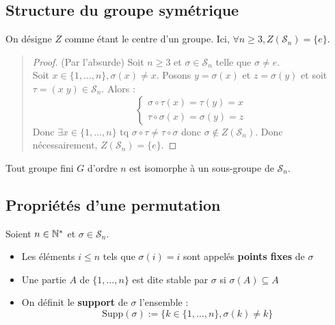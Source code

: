 \subsection{Structure du groupe symétrique}

\begin{theorem}
	On désigne $Z$ comme étant le centre d'un groupe. Ici, $\forall n \geq 3, Z(\mathcal{S}_n) = \{e\}$.
\end{theorem}

\begin{quote}
	\footnotesize
	\begin{proof}(Par l'absurde)
		Soit $n \geq 3$ et $\sigma \in \mathcal{S}_n$ telle que $ \sigma \not = e $. \\ 
		Soit $ x \in \{1,\dots,n\}, \sigma(x) \not = x$. Posons $y = \sigma(x)$ et $z = \sigma(y)$ et soit $\tau = (x \; y) \in \mathcal{S}_n$.
		Alors :
		\[
			\begin{cases}
				\sigma \circ \tau (x) = \tau(y) = x \\
				\tau \circ \sigma(x) = \sigma(y) = z 
			\end{cases} \]
		Donc $\exists x \in \{1,\dots,n\}$ tq $ \sigma \circ \tau \not = \tau \circ \sigma $ donc $ \sigma \not \in Z(\mathcal{S}_n)$.
		Donc nécessairement, $Z(\mathcal{S}_n) = \{e\}$.
	\end{proof}
	\normalsize
\end{quote}

\begin{theorem}[Cayley]
	Tout groupe fini $G$ d'ordre $n$ est isomorphe à un sous-groupe de $\mathcal{S}_n$.	
\end{theorem}

\subsection{Propriétés d'une permutation}

\begin{definition}
	Soient $n \in \mathbb{N}^*$ et $\sigma \in \mathcal{S}_n$.
	\begin{itemize}
		\item Les éléments $i \leq n$ tels que $\sigma(i) = i$ sont appelés \textbf{points fixes} de $\sigma$ 
		\item Une partie $A$ de $\{1,\dots,n\}$ est dite stable par $\sigma$ si $\sigma(A) \subseteq A$
		\item On définit le \textbf{support} de $\sigma$ l'ensemble : 
			\[ \boxed{ \text{ Supp} (\sigma) := \{k \in \{1,\dots,n\}, \sigma(k) \not = k \} }\]
	\end{itemize}
\end{definition}


